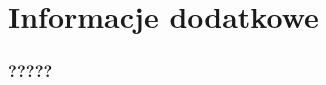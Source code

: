 \documentclass[10pt,t]{beamer}
\begin{document}























































\section{Informacje dodatkowe}









\begin{frame}
  \frametitle{?????}




\end{frame}
\end{document}
